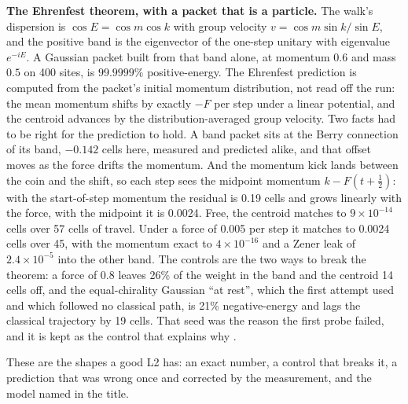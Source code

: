 \textbf{The Ehrenfest theorem, with a packet that is a particle.} The walk's dispersion is $\cos E = \cos m \cos k$
with group velocity $v = \cos m \sin k / \sin E$, and the positive band is the eigenvector of the one-step unitary
with eigenvalue $e^{-iE}$. A Gaussian packet built from that band alone, at momentum $0.6$ and mass $0.5$ on 400
sites, is $99.9999\%$ positive-energy. The Ehrenfest prediction is computed from the packet's initial momentum
distribution, not read off the run: the mean momentum shifts by exactly $-F$ per step under a linear potential, and
the centroid advances by the distribution-averaged group velocity. Two facts had to be right for the prediction to
hold. A band packet sits at the Berry connection of its band, $-0.142$ cells here, measured and predicted alike, and
that offset moves as the force drifts the momentum. And the momentum kick lands between the coin and the shift, so
each step sees the midpoint momentum $k - F(t + \tfrac12)$: with the start-of-step momentum the residual is 0.19
cells and grows linearly with the force, with the midpoint it is 0.0024. Free, the centroid matches to
$9\times10^{-14}$ cells over 57 cells of travel. Under a force of 0.005 per step it matches to 0.0024 cells over 45,
with the momentum exact to $4\times10^{-16}$ and a Zener leak of $2.4\times10^{-5}$ into the other band. The controls
are the two ways to break the theorem: a force of 0.8 leaves 26\% of the weight in the band and the centroid 14
cells off, and the equal-chirality Gaussian ``at rest'', which the first attempt used and which followed no
classical path, is 21\% negative-energy and lags the classical trajectory by 19 cells. That seed was the reason the
first probe failed, and it is kept as the control that explains why \cite{ehrenfest1927}.

These are the shapes a good L2 has: an exact number, a control that breaks it, a prediction that was wrong once and
corrected by the measurement, and the model named in the title.
